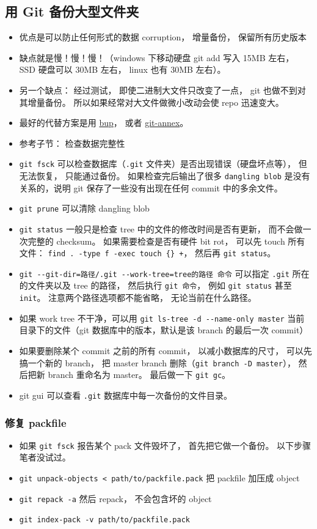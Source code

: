 \subsection{用 Git 备份大型文件夹}
\begin{itemize}
\item 优点是可以防止任何形式的数据 corruption， 增量备份， 保留所有历史版本
\item 缺点就是慢！慢！慢！（windows 下移动硬盘 git add 写入 15MB 左右， SSD 硬盘可以 30MB 左右， linux 也有 30MB 左右）。
\item 另一个缺点： 经过测试， 即使二进制大文件只改变了一点， git 也做不到对其增量备份。 所以如果经常对大文件做微小改动会使 repo 迅速变大。
\item 最好的代替方案是用 \href{https://bup.github.io/}{bup}， 或者 \href{https://git-annex.branchable.com/}{git-annex}。
\item 参考子节： 检查数据完整性
\item \verb`git fsck` 可以检查数据库（\verb`.git` 文件夹）是否出现错误（硬盘坏点等）， 但无法恢复， 只能通过备份。 如果检查完后输出了很多 \verb`dangling blob` 是没有关系的，说明 git 保存了一些没有出现在任何 commit 中的多余文件。
\item \verb`git prune` 可以清除 dangling blob
\item \verb`git status` 一般只是检查 tree 中的文件的修改时间是否有更新， 而不会做一次完整的 checksum。 如果需要检查是否有硬件 bit rot， 可以先 touch 所有文件： \verb`find . -type f -exec touch {} +`， 然后再 \verb`git status`。
\item \verb`git --git-dir=路径/.git --work-tree=tree的路径 命令` 可以指定 \verb`.git` 所在的文件夹以及 tree 的路径， 然后执行 \verb`git 命令`， 例如 \verb`git status` 甚至 \verb`init`。 注意两个路径选项都不能省略， 无论当前在什么路径。
\item 如果 work tree 不干净，可以用 \verb`git ls-tree -d --name-only master` 当前目录下的文件（git 数据库中的版本，默认是该 branch 的最后一次 commit）
\item 如果要删除某个 commit 之前的所有 commit， 以减小数据库的尺寸， 可以先搞一个新的 branch， 把 master branch 删除（\verb`git branch -D master`）， 然后把新 branch 重命名为 master。 最后做一下 \verb`git gc`。
\item git gui 可以查看 \verb`.git` 数据库中每一次备份的文件目录。
\end{itemize}

\subsubsection{修复 packfile}
\begin{itemize}
\item 如果 \verb`git fsck` 报告某个 pack 文件毁坏了， 首先把它做一个备份。 以下步骤笔者没试过。
\item \verb`git unpack-objects < path/to/packfile.pack` 把 packfile 加压成 object
\item \verb`git repack -a` 然后 repack， 不会包含坏的 object
\item \verb`git index-pack -v path/to/packfile.pack` 
\end{itemize}

